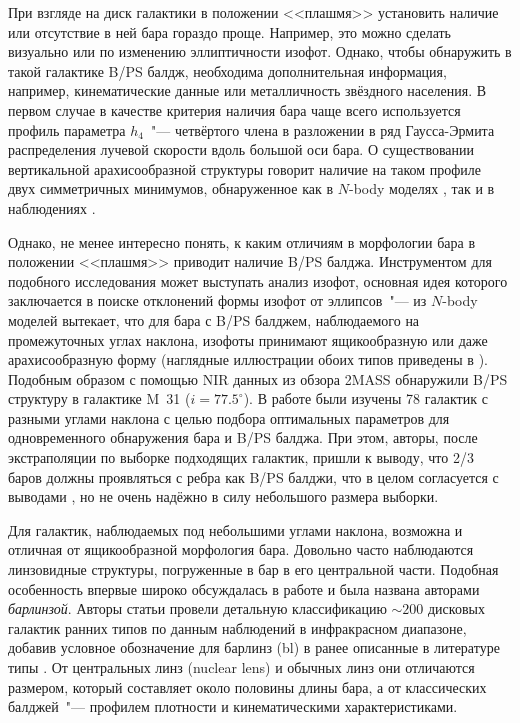 \documentclass{trlnotes}
\begin{document}
При взгляде на диск галактики в положении <<плашмя>> установить наличие или отсутствие в ней бара гораздо проще. Например, это можно сделать визуально или по изменению эллиптичности изофот. Однако, чтобы обнаружить в такой галактике B/PS балдж, необходима дополнительная информация, например, кинематические данные или металличность звёздного населения. В первом случае в качестве критерия наличия бара чаще всего используется профиль параметра $h_4$~"---  четвёртого члена в разложении в ряд Гаусса-Эрмита \citep{vandermarel1993} распределения лучевой скорости вдоль большой оси бара.  О существовании вертикальной арахисообразной структуры говорит наличие на таком профиле двух симметричных минимумов, обнаруженное как в $N$-body моделях \citep{debattista2005,iannuzzi2015}, так и в наблюдениях \citep{mendez-abreu2008}.

Однако, не менее интересно понять, к каким отличиям в морфологии бара в положении  <<плашмя>> приводит наличие B/PS балджа.  Инструментом для подобного исследования может выступать анализ изофот, основная идея которого заключается в поиске отклонений формы изофот от эллипсов~"--- из $N$-body моделей вытекает, что для бара с B/PS балджем, наблюдаемого на промежуточных углах наклона, изофоты принимают ящикообразную или даже арахисообразную форму (наглядные иллюстрации обоих типов приведены в \cite[Fig.~2]{erwin2016}). Подобным образом с помощью NIR данных из обзора 2MASS  \citet{beaton2007} обнаружили B/PS структуру в галактике M~31 ($i = 77.5^\circ$). В работе \citet{erwin2013} были изучены 78 галактик с разными углами наклона с целью подбора оптимальных параметров для одновременного обнаружения бара и B/PS балджа. При этом, авторы, после экстраполяции по выборке подходящих галактик, пришли к выводу, что 2/3 баров должны проявляться с ребра как B/PS балджи, что в целом согласуется с выводами \citet{lutticke2000a}, но не очень надёжно в силу небольшого размера выборки.

Для галактик, наблюдаемых под небольшими углами наклона, возможна и отличная от ящикообразной морфология бара. Довольно часто наблюдаются линзовидные структуры, погруженные в бар в его центральной части. Подобная особенность впервые широко обсуждалась в работе \citet{laurikainen2011} и была названа авторами \emph{барлинзой}.  Авторы статьи провели детальную классификацию $\sim\!200$ дисковых галактик ранних типов по данным наблюдений в инфракрасном диапазоне, добавив условное обозначение для барлинз (bl) в ранее описанные в литературе типы \citep{devaucouleurs1959,buta2010}. От центральных линз (nuclear lens) и обычных линз они отличаются размером, который составляет около половины длины бара, а от классических балджей~"--- профилем плотности и кинематическими характеристиками. 
\end{document}
